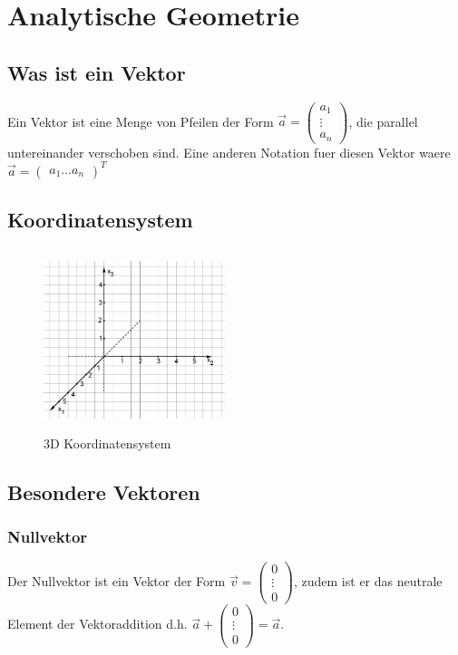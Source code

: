 \documentclass[a4paper]{article} %
\begin{document}
	\section{Analytische Geometrie}
	\subsection{Was ist ein Vektor}
	Ein Vektor ist eine Menge von Pfeilen der Form $\vec{a} = \begin{pmatrix} a_1 \\ \vdots \\ a_n \end{pmatrix} $, die parallel untereinander verschoben sind.
	Eine anderen Notation fuer diesen Vektor waere $\vec{a} = \begin{pmatrix} a_1  \hdots  a_n \end{pmatrix}^T $
	\subsection{Koordinatensystem}
	\begin{minipage}{0.5\textwidth}
			\begin{figure}[H]
				\includegraphics[width=200px, height=200px]{koordinatensystem.png}
					\captionsetup{labelformat=empty}
				\caption{3D Koordinatensystem}
			\end{figure}
		\end{minipage} 
	\subsection{Besondere Vektoren}
	\subsubsection{Nullvektor}
	Der Nullvektor ist ein Vektor der Form $\vec{v} = \begin{pmatrix} 0 \\ \vdots \\ 0 \end{pmatrix}$, 
	 zudem ist er das neutrale Element der Vektoraddition d.h. $ \vec{a} + \begin{pmatrix} 0 \\ \vdots \\ 0 \end{pmatrix} = \vec{a}$.
\end{document}
